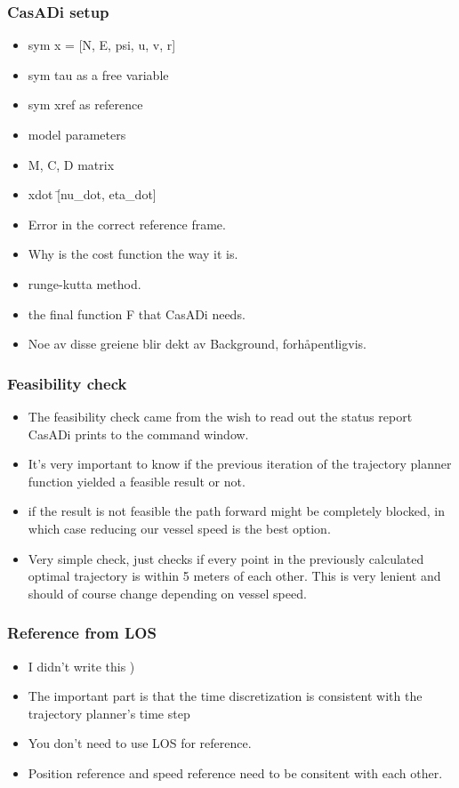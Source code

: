 \subsubsection{CasADi setup}
\begin{itemize}
    \item sym x = [N, E, psi, u, v, r]
    \item sym tau as a free variable
    \item sym xref as reference
    \item model parameters
    \item M, C, D matrix
    \item xdot \= [nu\_dot, eta\_dot]
    \item Error in the correct reference frame.
    \item Why is the cost function the way it is.
    \item runge-kutta method.
    \item the final function F that CasADi needs.
    \item Noe av disse greiene blir dekt av Background, forhåpentligvis.
\end{itemize}

\subsubsection{Feasibility check}
\begin{itemize}
    \item The feasibility check came from the wish to read out the status report CasADi prints to the command window.
    \item It's very important to know if the previous iteration of the trajectory planner function yielded a feasible result or not.
    \item if the result is not feasible the path forward might be completely blocked, in which case reducing our vessel speed is the best option.
    \item Very simple check, just checks if every point in the previously calculated optimal trajectory is within 5 meters of each other. This is very lenient and should of course change depending on vessel speed.
\end{itemize}

\subsubsection{Reference from LOS}
\begin{itemize}
    \item I didn't write this \:)
    \item The important part is that the time discretization is consistent with the trajectory planner's time step
    \item You don't need to use LOS for reference.
    \item Position reference and speed reference need to be consitent with each other.
\end{itemize} 



